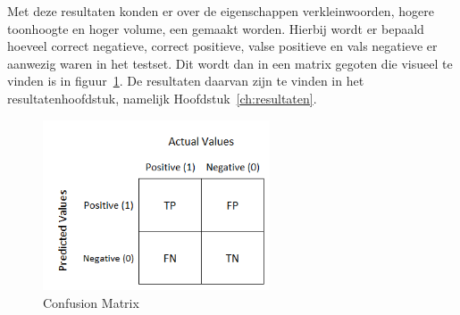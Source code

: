 Met deze resultaten konden er over de eigenschappen verkleinwoorden, hogere toonhoogte en hoger volume, een  gemaakt worden. Hierbij wordt er bepaald hoeveel correct negatieve, correct positieve, valse positieve en vals negatieve er aanwezig waren in het testset. Dit wordt dan in een matrix gegoten die visueel te vinden is in figuur~\ref{fig:confusion_matrix}. De resultaten daarvan zijn te vinden in het resultatenhoofdstuk, namelijk Hoofdstuk~\ref{ch:resultaten}.

\begin{figure}
    \centering
    \includegraphics[width=0.6\textwidth]{./img/confusion_matrix}
    \caption{\label{fig:confusion_matrix} Confusion Matrix~\autocite{Jain2020}}
\end{figure}
